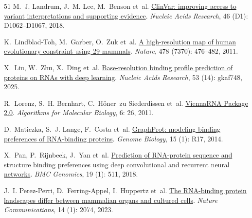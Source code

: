 \begin{thebibliography}{51}
M.~J. Landrum, J.~M. Lee, M.~Benson et~al.
\newblock \href{https://doi.org/10.1093/nar/gkx1153}{{ClinVar}: improving
  access to variant interpretations and supporting evidence}.
\newblock \emph{Nucleic Acids Research}, 46 (D1):
  D1062--D1067, 2018.

K.~Lindblad-Toh, M.~Garber, O.~Zuk et~al.
\newblock \href{https://doi.org/10.1038/nature10530}{A high-resolution map of
  human evolutionary constraint using 29 mammals}.
\newblock \emph{Nature}, 478 (7370): 476--482, 2011.

X.~Liu, W.~Zhu, X.~Ding et~al.
\newblock \href{https://doi.org/10.1093/nar/gkaf748}{Base-resolution binding
  profile prediction of proteins on RNAs with deep learning}.
\newblock \emph{Nucleic Acids Research}, 53 (14): gkaf748,
  2025.

R.~Lorenz, S.~H. Bernhart, C.~H{\"o}ner~zu Siederdissen et~al.
\newblock \href{https://doi.org/10.1186/1748-7188-6-26}{{ViennaRNA Package
  2.0}}.
\newblock \emph{Algorithms for Molecular Biology}, 6: 26, 2011.

D.~Maticzka, S.~J. Lange, F.~Costa et~al.
\newblock \href{https://doi.org/10.1186/gb-2014-15-1-r17}{{GraphProt}: modeling
  binding preferences of {RNA}-binding proteins}.
\newblock \emph{Genome Biology}, 15 (1): R17, 2014.

X.~Pan, P.~Rijnbeek, J.~Yan et~al.
\newblock \href{https://doi.org/10.1186/s12864-018-4889-1}{Prediction of
  RNA-protein sequence and structure binding preferences using deep
  convolutional and recurrent neural networks}.
\newblock \emph{BMC Genomics}, 19 (1): 511, 2018.

J.~I. Perez-Perri, D.~Ferring-Appel, I.~Huppertz et~al.
\newblock \href{https://doi.org/10.1038/s41467-023-37494-w}{The RNA-binding
  protein landscapes differ between mammalian organs and cultured cells}.
\newblock \emph{Nature Communications}, 14 (1): 2074, 2023.


\end{thebibliography}

